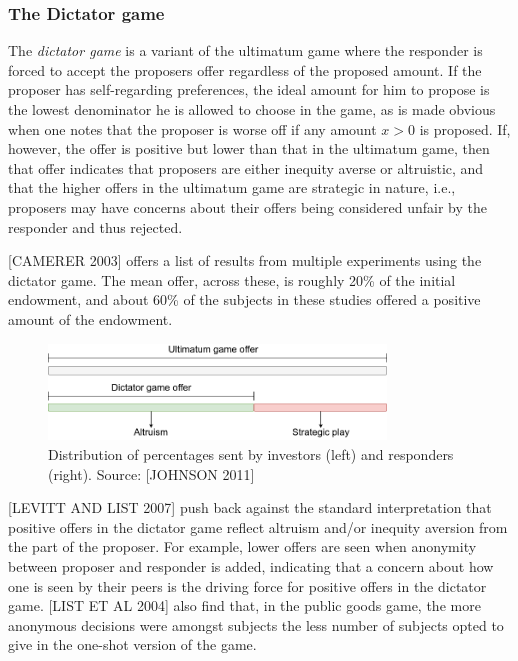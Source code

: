 \message{ !name(tese.tex)}\documentclass{article}
\begin{document}
\subsubsection{The Dictator game}

The \textit{dictator game} is a variant of the ultimatum game where the responder is forced to accept the proposers offer regardless of the proposed amount. If the proposer has self-regarding preferences, the ideal amount for him to propose is the lowest denominator he is allowed to choose in the game, as is made obvious when one notes that the proposer is worse off if any amount $x>0$ is proposed. If, however, the offer is positive but lower than that in the ultimatum game, then that offer indicates that proposers are either inequity averse or altruistic, and that the higher offers in the ultimatum game are strategic in nature, i.e., proposers may have concerns about their offers being considered unfair by the responder and thus rejected.

[CAMERER 2003] offers a list of results from multiple experiments using the dictator game. The mean offer, across these, is roughly 20\% of the initial endowment, and about 60\% of the subjects in these studies offered a positive amount of the endowment.



\begin{figure}[H]
	\centering
	\includegraphics[width=0.8\textwidth]{dictatoroffer.png}
	\caption{Distribution of percentages sent by investors (left) and responders (right). Source: [JOHNSON 2011]}
	\label{fig:dictatorcomponent}
\end{figure}

[LEVITT AND LIST 2007] push back against the standard interpretation that positive offers in the dictator game reflect altruism and/or inequity aversion from the part of the proposer. For example, lower offers are seen when anonymity between proposer and responder is added, indicating that a concern about how one is seen by their peers is the driving force for positive offers in the dictator game. [LIST ET AL 2004] also find that, in the public goods game, the more anonymous decisions were amongst subjects the less number of subjects opted to give in the one-shot version of the game. 
\end{document}
